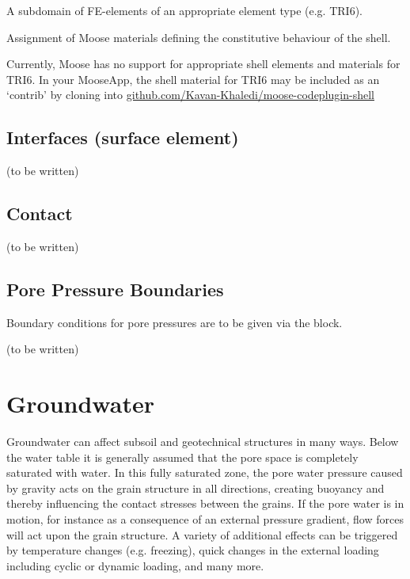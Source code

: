 \begin{description}[font=$\bullet$~\normalfont]
  \item [subdomain:] A subdomain of FE-elements of an appropriate element type (e.g. TRI6).
  \item [materials:] Assignment of Moose materials defining the constitutive behaviour of the shell.
\end{description}

Currently, Moose has no support for appropriate shell elements and materials
for TRI6. In your MooseApp, the shell material for TRI6 may be included as an
‘contrib’ by cloning into
\href{https://github.com/Kavan-Khaledi/moose-codeplugin-shell}{github.com/Kavan-Khaledi/moose-codeplugin-shell}

\subsection{Interfaces (surface element)}

(to be written)

\subsection{Contact}

(to be written)

\subsection{Pore Pressure Boundaries}

Boundary conditions for pore pressures are to be given via the \codeword{[BCs]}
block.



(to be written)

\section{Groundwater}
\label{chap:entities-groundwater}

Groundwater can affect subsoil and geotechnical structures in many ways. Below
the water table it is generally assumed that the pore space is completely
saturated with water. In this fully saturated zone, the pore water pressure
caused by gravity acts on the grain structure in all directions, creating
buoyancy and thereby influencing the contact stresses between the grains. If
the pore water is in motion, for instance as a consequence of an external
pressure gradient, flow forces will act upon the grain structure. A variety of
additional effects can be triggered by temperature changes (e.g. freezing),
quick changes in the external loading including cyclic or dynamic loading, and
many more.


